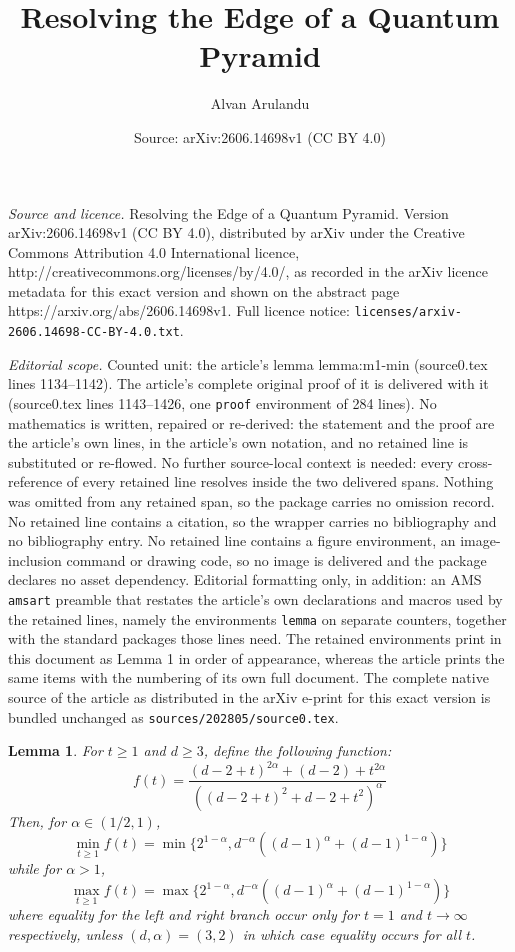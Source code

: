 \documentclass[10pt,a4paper]{amsart}
\title{Resolving the Edge of a Quantum Pyramid}
\author{Alvan Arulandu}
\date{Source: arXiv:2606.14698v1 (CC BY 4.0)}
\newtheorem{lemma}{Lemma}
\begin{document}
\maketitle

\noindent\emph{Source and licence.} Resolving the Edge of a Quantum Pyramid. Version arXiv:2606.14698v1 (CC BY 4.0), distributed by arXiv under the Creative Commons Attribution 4.0 International licence, http://creativecommons.org/licenses/by/4.0/, as recorded in the arXiv licence metadata for this exact version and shown on the abstract page https://arxiv.org/abs/2606.14698v1. Full licence notice: \texttt{licenses/arxiv-2606.14698-CC-BY-4.0.txt}.\par\smallskip

\noindent\textit{Editorial scope.} Counted unit: the article's lemma lemma:m1-min (source0.tex lines 1134--1142). The article's complete original proof of it is delivered with it (source0.tex lines 1143--1426, one \texttt{proof} environment of 284 lines). No mathematics is written, repaired or re-derived: the statement and the proof are the article's own lines, in the article's own notation, and no retained line is substituted or re-flowed.  No further source-local context is needed: every cross-reference of every retained line resolves inside the two delivered spans.  Nothing was omitted from any retained span, so the package carries no omission record.  No retained line contains a citation, so the wrapper carries no bibliography and no bibliography entry.  No retained line contains a figure environment, an image-inclusion command or drawing code, so no image is delivered and the package declares no asset dependency.  Editorial formatting only, in addition: an AMS \texttt{amsart} preamble that restates the article's own declarations and macros used by the retained lines, namely the environments \texttt{lemma} on separate counters, together with the standard packages those lines need.  The retained environments print in this document as Lemma 1 in order of appearance, whereas the article prints the same items with the numbering of its own full document.  The complete native source of the article as distributed in the arXiv e-print for this exact version is bundled unchanged as \texttt{sources/202805/source0.tex}.
\begin{lemma}\label{lemma:m1-min}
   For $t\geq 1$ and $d\geq 3$, define the following function:
   $$f(t)=\frac{(d-2+t)^{2\alpha}+(d-2)+t^{2\alpha}}{((d-2+t)^{2}+d-2+t^2)^\alpha}$$
   Then, for $\alpha \in (1/2,1)$,
   $$\min_{t\geq 1}f(t)=\min\{2^{1-\alpha},d^{-\alpha}((d-1)^\alpha+(d-1)^{1-\alpha})\}$$
   while for $\alpha > 1$, 
   $$\max_{t\geq 1}f(t)=\max\{2^{1-\alpha},d^{-\alpha}((d-1)^\alpha+(d-1)^{1-\alpha})\}$$
   where equality for the left and right branch occur only for $t=1$ and $t\to \infty$ respectively, unless $(d,\alpha)=(3,2)$ in which case equality occurs for all $t$. 
\end{lemma}
\end{document}
